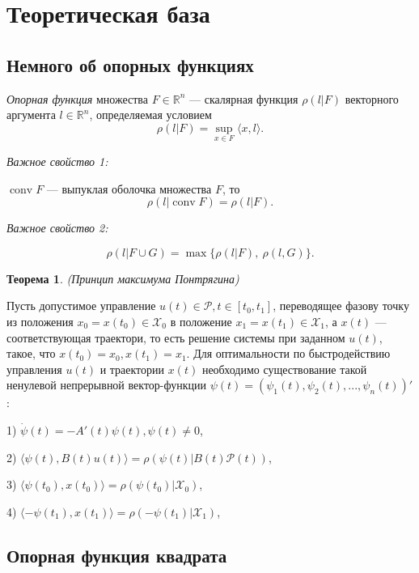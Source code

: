 \documentclass{article}
\theoremstyle{definition}
\newcommand{\conv}{\mathop{\mathrm{conv}}}
\begin{document}
\newpage

\section{Теоретическая база}
\subsection{Немного об опорных функциях}

\textit{Опорная функция} множества $F \in \mathbb{R}^n$ ---
скалярная функция $\rho(l | F)$ векторного аргумента $l \in \mathbb{R}^n$,
определяемая условием $$\rho(l | F) = \sup _{x \in F}{\langle x, l \rangle}.$$

\textit{Важное свойство 1:}

 $\conv F$ --- выпуклая оболочка множества $F$, то $$\rho(l|\conv F) = \rho(l|F).$$

\textit{Важное свойство 2:}

\noindent$$\rho(l|F \cup G) = \max\{\rho(l|F),~\rho(l,G) \}.$$

\newtheorem{theorem}{Теорема}
 	\begin{theorem}
 		\textit{(Принцип максимума Понтрягина)}

    Пусть допустимое управление $u(t) \in \mathcal{P}, t \in [t_0,t_1]$, переводящее фазову точку из положения 
    $x_0 = x(t_0) \in \mathcal{X_0}$ в положение $x_1 = x(t_1) \in \mathcal{X_1}$, а $x(t)$  --- 
    соответствующая траектори, то есть решение системы при заданном $u(t)$, такое, что $x(t_0) = x_0, x(t_1) = x_1$.
    Для оптимальности по быстродействию управления $u(t)$ и траектории $x(t)$ необходимо существование
    такой ненулевой непрерывной вектор-функции $\psi(t) = (\psi_1(t),\psi_2(t),...,\psi_n(t))'$:

    1) $\dot \psi(t) = -A'(t)\psi(t), \psi(t) \neq 0$,

    2) $\langle \psi(t), B(t)u(t)\rangle = \rho(\psi(t)|B(t)\mathcal{P}(t))$,

    3) $\langle \psi(t_0), x(t_0)\rangle = \rho(\psi(t_0)|\mathcal{X}_0)$,

    4) $\langle - \psi(t_1), x(t_1)\rangle = \rho(-\psi(t_1)|\mathcal{X}_1)$,
	\end{theorem}

\subsection{Опорная функция квадрата}
\end{document}
